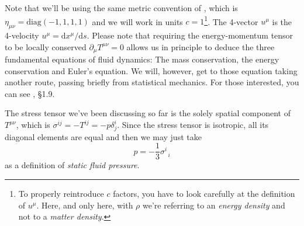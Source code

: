 Note that we'll be using the same metric convention of \cite{carroll}, which is $\eta_{\mu\nu} = \text{diag}(-1,1,1,1)$ and we will work in units $c=1$\footnote{To properly reintroduce $c$ factors, you have to look carefully at the definition of $u^{\mu}$. Here, and only here, with $\rho$ we're referring to an \emph{energy density} and not to a \emph{matter density}.}. The 4-vector $u^{\mu}$ is the 4-velocity $u^{\mu} = \text{d}x^{\mu}/\text{d}s$. Please note that requiring the energy-momentum tensor to be locally conserved $\partial_{\mu}T^{\mu\nu} = 0$ allows us in principle to deduce the three fundamental equations of fluid dynamics: The mass conservation, the energy conservation and Euler's equation. We will, however, get to those equation taking another route, passing briefly from statistical mechanics. For those interested, you can see \cite{carroll}, §1.9.
\par The stress tensor we've been discussing so far is the solely spatial component of $T^{\mu\nu}$, which is $\sigma^{ij}=-T^{ij} = -p\delta^{i}_{j}$. Since the stress tensor is isotropic, all its diagonal elements are equal and then we may just take 
\begin{equation*}
    p = -\frac{1}{3}\sigma^{i}_{\;\;i}
\end{equation*}
as a definition of \emph{static fluid pressure}.
